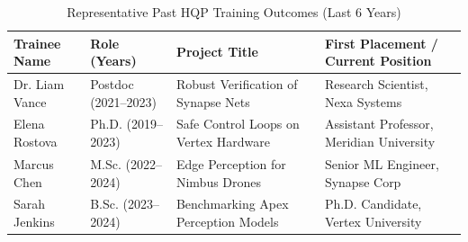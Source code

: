 \begin{table}[htbp]
  \centering
  \caption{Representative Past HQP Training Outcomes (Last 6 Years)}
  \label{tab:past_hqp}
  \small
  \begin{tabularx}{\textwidth}{l l l X}
    \toprule
    \textbf{Trainee Name} & \textbf{Role (Years)} & \textbf{Project Title} & \textbf{First Placement / Current Position} \\
    \midrule
    Dr. Liam Vance & Postdoc (2021--2023) & Robust Verification of Synapse Nets & Research Scientist, Nexa Systems \\
    Elena Rostova & Ph.D. (2019--2023) & Safe Control Loops on Vertex Hardware & Assistant Professor, Meridian University \\
    Marcus Chen & M.Sc. (2022--2024) & Edge Perception for Nimbus Drones & Senior ML Engineer, Synapse Corp \\
    Sarah Jenkins & B.Sc. (2023--2024) & Benchmarking Apex Perception Models & Ph.D. Candidate, Vertex University \\
    \bottomrule
  \end{tabularx}
\end{table}
